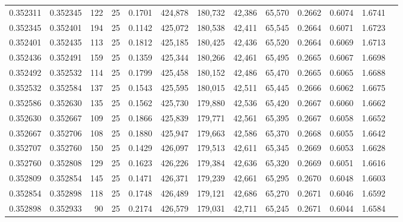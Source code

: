 \begin{tabular}{rrrrrrrrrrrrr}
0.352311 & 0.352345 &   122 &  25 &                                     0.1701 & 424,878 & 180,732 &  42,386 &  65,570 & 0.2662 & 0.6074 & 1.6741 \\
0.352345 & 0.352401 &   194 &  25 &                                     0.1142 & 425,072 & 180,538 &  42,411 &  65,545 & 0.2664 & 0.6071 & 1.6723 \\
0.352401 & 0.352435 &   113 &  25 &                                     0.1812 & 425,185 & 180,425 &  42,436 &  65,520 & 0.2664 & 0.6069 & 1.6713 \\
0.352436 & 0.352491 &   159 &  25 &                                     0.1359 & 425,344 & 180,266 &  42,461 &  65,495 & 0.2665 & 0.6067 & 1.6698 \\
0.352492 & 0.352532 &   114 &  25 &                                     0.1799 & 425,458 & 180,152 &  42,486 &  65,470 & 0.2665 & 0.6065 & 1.6688 \\
0.352532 & 0.352584 &   137 &  25 &                                     0.1543 & 425,595 & 180,015 &  42,511 &  65,445 & 0.2666 & 0.6062 & 1.6675 \\
0.352586 & 0.352630 &   135 &  25 &                                     0.1562 & 425,730 & 179,880 &  42,536 &  65,420 & 0.2667 & 0.6060 & 1.6662 \\
0.352630 & 0.352667 &   109 &  25 &                                     0.1866 & 425,839 & 179,771 &  42,561 &  65,395 & 0.2667 & 0.6058 & 1.6652 \\
0.352667 & 0.352706 &   108 &  25 &                                     0.1880 & 425,947 & 179,663 &  42,586 &  65,370 & 0.2668 & 0.6055 & 1.6642 \\
0.352707 & 0.352760 &   150 &  25 &                                     0.1429 & 426,097 & 179,513 &  42,611 &  65,345 & 0.2669 & 0.6053 & 1.6628 \\
0.352760 & 0.352808 &   129 &  25 &                                     0.1623 & 426,226 & 179,384 &  42,636 &  65,320 & 0.2669 & 0.6051 & 1.6616 \\
0.352809 & 0.352854 &   145 &  25 &                                     0.1471 & 426,371 & 179,239 &  42,661 &  65,295 & 0.2670 & 0.6048 & 1.6603 \\
0.352854 & 0.352898 &   118 &  25 &                                     0.1748 & 426,489 & 179,121 &  42,686 &  65,270 & 0.2671 & 0.6046 & 1.6592 \\
0.352898 & 0.352933 &    90 &  25 &                                     0.2174 & 426,579 & 179,031 &  42,711 &  65,245 & 0.2671 & 0.6044 & 1.6584 \\

\end{tabular}
